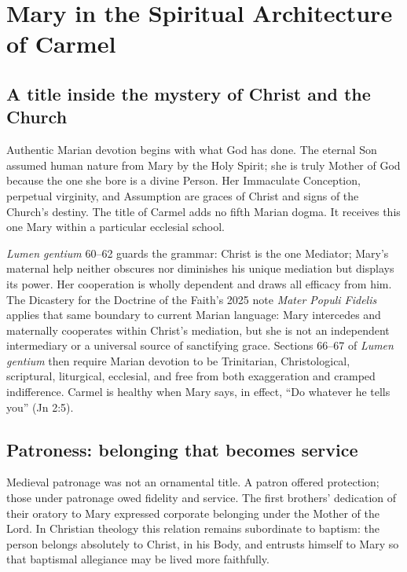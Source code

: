 \section{Mary in the Spiritual Architecture of Carmel}

\subsection{A title inside the mystery of Christ and the Church}

Authentic Marian devotion begins with what God has done. The eternal Son assumed human nature from Mary by the Holy Spirit; she is truly Mother of God because the one she bore is a divine Person. Her Immaculate Conception, perpetual virginity, and Assumption are graces of Christ and signs of the Church's destiny. The title of Carmel adds no fifth Marian dogma. It receives this one Mary within a particular ecclesial school.

\textit{Lumen gentium} 60--62 guards the grammar: Christ is the one Mediator; Mary's maternal help neither obscures nor diminishes his unique mediation but displays its power. Her cooperation is wholly dependent and draws all efficacy from him. The Dicastery for the Doctrine of the Faith's 2025 note \textit{Mater Populi Fidelis} applies that same boundary to current Marian language: Mary intercedes and maternally cooperates within Christ's mediation, but she is not an independent intermediary or a universal source of sanctifying grace. Sections 66--67 of \textit{Lumen gentium} then require Marian devotion to be Trinitarian, Christological, scriptural, liturgical, ecclesial, and free from both exaggeration and cramped indifference. Carmel is healthy when Mary says, in effect, ``Do whatever he tells you'' (Jn 2:5).

\subsection{Patroness: belonging that becomes service}

Medieval patronage was not an ornamental title. A patron offered protection; those under patronage owed fidelity and service. The first brothers' dedication of their oratory to Mary expressed corporate belonging under the Mother of the Lord. In Christian theology this relation remains subordinate to baptism: the person belongs absolutely to Christ, in his Body, and entrusts himself to Mary so that baptismal allegiance may be lived more faithfully.

